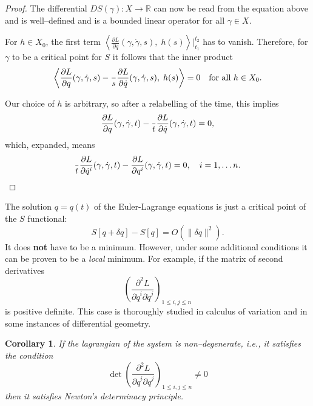 \documentclass[english,fontsize=11pt,paper=a5,oneside]{scrbook}
\newcommand{\R}{\mathbb{R}}
\newcommand{\lag}{\langle}
\newcommand{\rag}{\rangle}
\let\d\relax
\DeclareMathOperator{\d}{d}
\newtheorem{corollary}[theorem]{Corollary}
\theoremstyle{definition}
\newenvironment{remark}
  {\pushQED{\qed}\renewcommand{\qedsymbol}{$\lozenge$}\remarkx}
  {\popQED\endremarkx}
\begin{document}
\begin{proof}
    The differential $DS(\gamma): X \to \R$ can now be read from the equation above and is well--defined and is a bounded linear operator for all $\gamma\in X$.

    For $h\in X_0$, the first term $\left\lag\frac{\partial L}{\partial \dot q}(\gamma, \dot \gamma, s),\; h(s)\right\rag\Big|_{t_1}^{t_2}$ has to vanish. Therefore, for $\gamma$ to be a critical point for $S$ it follows that the inner product
    \begin{equation}
        \left\lag
            \frac{\partial L}{\partial q}(\gamma, \dot \gamma, s)
            - \frac{\d}{\d s}\frac{\partial L}{\partial \dot q}(\gamma, \dot \gamma, s)
        ,\; h(s)\right\rag = 0 \quad\mbox{for all } h\in X_0.
    \end{equation}

    Our choice of $h$ is arbitrary, so after a relabelling of the time, this implies
    \begin{equation}
        \frac{\partial L}{\partial q}(\gamma, \dot \gamma, t)
            - \frac{\d}{\d t}\frac{\partial L}{\partial \dot q}(\gamma, \dot \gamma, t) = 0,
    \end{equation}
    which, expanded, means
    \begin{equation}
        \frac{\d}{\d t}\frac{\partial L}{\partial \dot q^i}(\gamma, \dot \gamma, t) - \frac{\partial L}{\partial q^i}(\gamma, \dot \gamma, t) = 0, \quad i=1,\ldots n.
    \end{equation}
\end{proof}

\begin{remark}
    The solution $q=q(t)$ of the Euler-Lagrange equations is just a critical point of the $S$ functional:
    \begin{equation}
        S[q + \delta q] - S[q] = O(\|\delta q\|^2).
    \end{equation}
    It does \textbf{not} have to be a minimum. However, under some additional conditions it can be proven to be a \emph{local} minimum.
    For example, if the matrix of second derivatives
    \begin{equation}
        \left(
            \frac{\partial^2 L}{\partial\dot q^i \partial\dot q^j}
        \right)_{1\leq i,j\leq n}
    \end{equation}
    is positive definite.
    This case is thoroughly studied in calculus of variation and in some instances of differential geometry.
\end{remark}

\begin{corollary}
    If the lagrangian of the system is \emph{non--degenerate}, i.e., it satisfies the condition
    \begin{equation}
            \det \left(\frac{\partial^2 L}{\partial\dot q^i \partial\dot q^j}
        \right)_{1\leq i,j\leq n} \neq 0
    \end{equation}
    then it satisfies Newton's determinacy principle.
\end{corollary}
\end{document}
